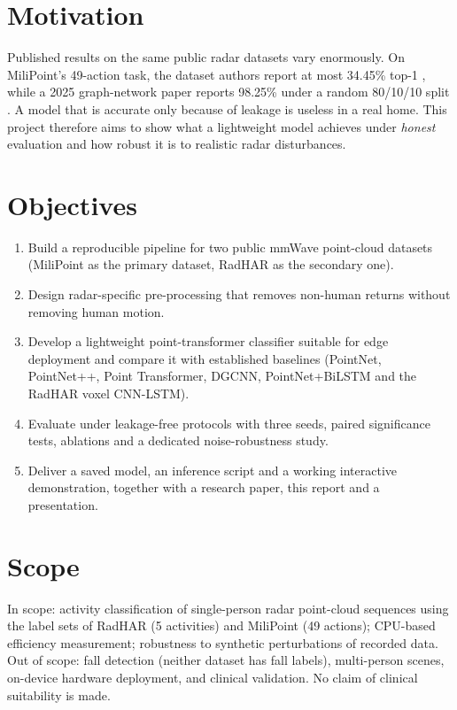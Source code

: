 \section{Motivation}
Published results on the same public radar datasets vary enormously. On
MiliPoint's 49-action task, the dataset authors report at most 34.45\% top-1
\cite{cui2023milipoint}, while a 2025 graph-network paper reports 98.25\% under a
random 80/10/10 split \cite{zakka2025makgcn}. A model that is accurate only
because of leakage is useless in a real home. This project therefore aims to
show what a lightweight model achieves under \emph{honest} evaluation and how
robust it is to realistic radar disturbances.

\section{Objectives}
\begin{enumerate}[nosep]
\item Build a reproducible pipeline for two public mmWave point-cloud datasets
  (MiliPoint as the primary dataset, RadHAR as the secondary one).
\item Design radar-specific pre-processing that removes non-human returns without
  removing human motion.
\item Develop a lightweight point-transformer classifier suitable for edge
  deployment and compare it with established baselines (PointNet, PointNet++,
  Point Transformer, DGCNN, PointNet+BiLSTM and the RadHAR voxel CNN-LSTM).
\item Evaluate under leakage-free protocols with three seeds, paired significance
  tests, ablations and a dedicated noise-robustness study.
\item Deliver a saved model, an inference script and a working interactive
  demonstration, together with a research paper, this report and a presentation.
\end{enumerate}

\section{Scope}
In scope: activity classification of single-person radar point-cloud sequences
using the label sets of RadHAR (5 activities) and MiliPoint (49 actions);
CPU-based efficiency measurement; robustness to synthetic perturbations of
recorded data.
Out of scope: fall detection (neither dataset has fall labels), multi-person
scenes, on-device hardware deployment, and clinical validation. No claim of
clinical suitability is made.

